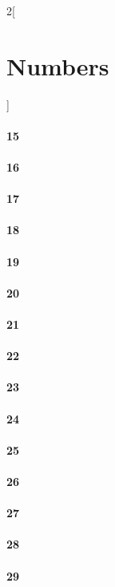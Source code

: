 \documentclass{book}
\begin{document}
\begin{multicols}{2}[\part{Numbers}]
\subsection*{15}
\subsection*{16}
\subsection*{17}
\subsection*{18}
\subsection*{19}
\subsection*{20}
\subsection*{21}
\subsection*{22}
\subsection*{23}
\subsection*{24}
\subsection*{25}
\subsection*{26}
\subsection*{27}
\subsection*{28}
\subsection*{29}

\end{multicols}
\end{document}

